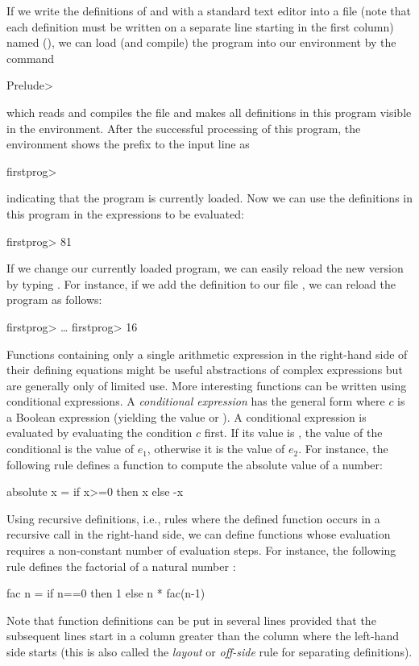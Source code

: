If we write the definitions of  and 
with a standard text editor
into a file (note that each definition must be written on a separate
line starting in the first column) named 
(),
we can load (and compile) the program into our environment
by the command
\begin{prog}
Prelude> 
\end{prog}
which reads and compiles the file  and
makes all definitions in this program visible in the environment.
After the successful processing of this program, the environment
shows the prefix to the input line as
\begin{prog}
firstprog>
\end{prog}
indicating that the program  is currently loaded.
Now we can use the definitions in this program in the expressions
to be evaluated:
\begin{prog}
firstprog> 
81
\end{prog}
If we change our currently loaded program, we can easily reload
the new version by typing . For instance,
if we add the definition  to our file
, we can reload the program as follows:
\begin{prog}
firstprog> 
\ldots
firstprog> 
16
\end{prog}
Functions containing only a single arithmetic expression in the
right-hand side of their defining equations might be useful abstractions
of complex expressions but are generally only of limited use.
More interesting functions can be written using conditional
expressions. A \emph{conditional expression}%
has the general form 
where $c$ is a Boolean expression (yielding the value 
or ). A conditional expression is evaluated by
evaluating the condition $c$ first. If its value is ,
the value of the conditional is the value of $e_1$, otherwise
it is the value of $e_2$. For instance, the following rule
defines a function to compute the absolute value of a number:
\begin{curry}
absolute x = if x>=0 then x else -x
\end{curry}
Using recursive definitions, i.e., rules where the defined
function occurs in a recursive call in the right-hand side,
we can define functions whose evaluation requires a non-constant
number of evaluation steps. For instance, the following rule
defines the factorial of a natural number
:
\begin{curry}
fac n = if n==0 then 1
                else n * fac(n-1)
\end{curry}
Note that function definitions can be put in several lines
provided that the subsequent lines start in a column greater
than the column where the left-hand side starts
(this is also called the \emph{layout}
or \emph{off-side} rule for separating
definitions).

